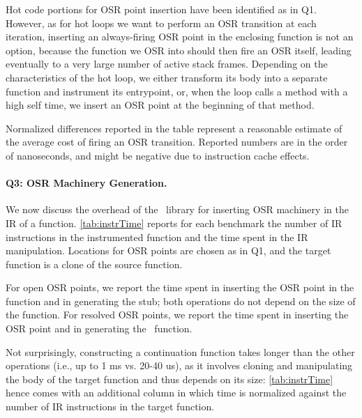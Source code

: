 \begin{description}
Hot code portions for OSR point insertion have been identified as in Q1. %
\ifdefined\fullver %
However, as for hot loops we want to perform an OSR transition at each iteration, inserting an always-firing OSR point in the enclosing function is not an option, because the function we OSR into should then fire an OSR itself, leading eventually to a very large number of active stack frames. 
\fi %
Depending on the characteristics of the hot loop, we either transform its body into a separate function and instrument its entrypoint, or, when the loop calls a method with a high self time, we insert an OSR point at the beginning of that method.

Normalized differences reported in the table represent a reasonable estimate of the average cost of firing an OSR transition.
Reported numbers are in the order of nanoseconds, and might be negative due to instruction cache effects.

\paragraph{Q3: OSR Machinery Generation.}
We now discuss the overhead of the \osrkit\ library for inserting OSR machinery in the IR of a function. \mytable\ref{tab:instrTime} reports for each benchmark the number of IR instructions in the instrumented function and the time spent in the IR manipulation. Locations for OSR points are chosen as in 
Q1, and the target function is a clone of the source function.

For open OSR points, we report the time spent in inserting the OSR point in the function and in generating the stub; both operations do not depend on the size of the function. For resolved OSR points, we report the time spent in inserting the OSR point and in generating the \fosrto\ function.

Not surprisingly, constructing a continuation function takes longer than the other operations (i.e., up to 1 ms vs. 20-40 us), as it involves cloning and manipulating the body of the target function and thus depends on its size: \mytable\ref{tab:instrTime} hence comes with an additional column in which time is normalized against the number of IR instructions in the target function.


\end{description}
